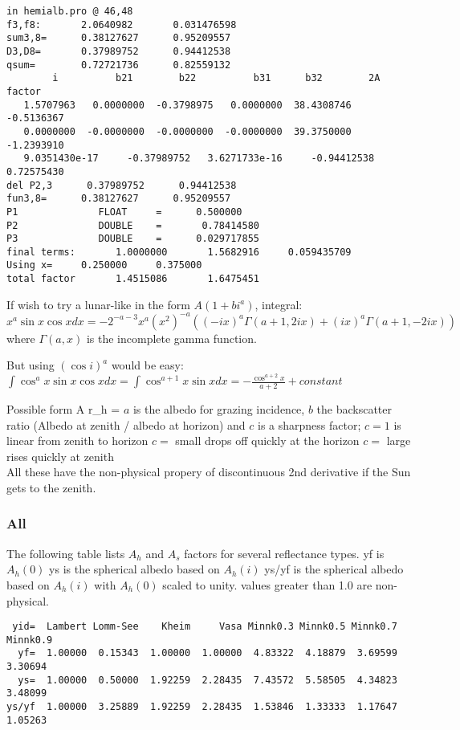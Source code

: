 \vspace{-3.mm} 
\begin{verbatim}
in hemialb.pro @ 46,48
f3,f8:       2.0640982       0.031476598
sum3,8=      0.38127627      0.95209557
D3,D8=       0.37989752      0.94412538
qsum=        0.72721736      0.82559132
        i          b21        b22          b31      b32        2A factor
   1.5707963   0.0000000  -0.3798975   0.0000000  38.4308746  -0.5136367
   0.0000000  -0.0000000  -0.0000000  -0.0000000  39.3750000  -1.2393910
   9.0351430e-17     -0.37989752   3.6271733e-16     -0.94412538      0.72575430
del P2,3      0.37989752      0.94412538
fun3,8=      0.38127627      0.95209557
P1              FLOAT     =      0.500000
P2              DOUBLE    =       0.78414580
P3              DOUBLE    =      0.029717855
final terms:       1.0000000       1.5682916     0.059435709
Using x=     0.250000     0.375000
total factor       1.4515086       1.6475451
\end{verbatim} 

If wish to try a lunar-like in the form $A ( 1+ b i^a)$,   
integral:  $x^a \sin x \cos x dx = -2^{-a-3} x^a (x^2)^{-a} ((-i x)^a \Gamma(a+1, 2 i x)+(i x)^a \Gamma(a+1, -2 i x))$
where $\Gamma(a,x)$ is the incomplete gamma function.

But using $(\cos i)^a$ would be easy:  $\int  \cos^a x \sin x \cos x dx = \int \cos^{a+1} x \sin x dx =  -\frac{\cos^{a+2} x}{a+2} +constant $

Possible form \qbn A \equiv r_h =  
$a$ is the albedo for grazing incidence, $b$ the backscatter ratio (Albedo at zenith / albedo at horizon) and $c$ is a sharpness factor;
\qi $c=1$ is linear from zenith to horizon 
\qi $c=$ small drops off quickly at the horizon
\qi $c=$ large rises quickly at zenith
\\ All these have the non-physical propery of discontinuous 2nd derivative if the Sun gets to the zenith.

\normalsize

\subsubsection{All \label{all}} 
 The following table lists $A_h$ and $A_s$ factors for several reflectance types.
\qi yf is $A_h(0)$
\qi ys is the spherical albedo based on $A_h(i)$
\qi ys/yf is the spherical albedo based on $A_h(i)$ with $A_h(0)$ scaled to unity.
\qii values greater than 1.0 are non-physical.
\vspace{-3.mm} 
\begin{verbatim}
 yid=  Lambert Lomm-See    Kheim     Vasa Minnk0.3 Minnk0.5 Minnk0.7 Minnk0.9
  yf=  1.00000  0.15343  1.00000  1.00000  4.83322  4.18879  3.69599  3.30694
  ys=  1.00000  0.50000  1.92259  2.28435  7.43572  5.58505  4.34823  3.48099
ys/yf  1.00000  3.25889  1.92259  2.28435  1.53846  1.33333  1.17647  1.05263
\end{verbatim} 

